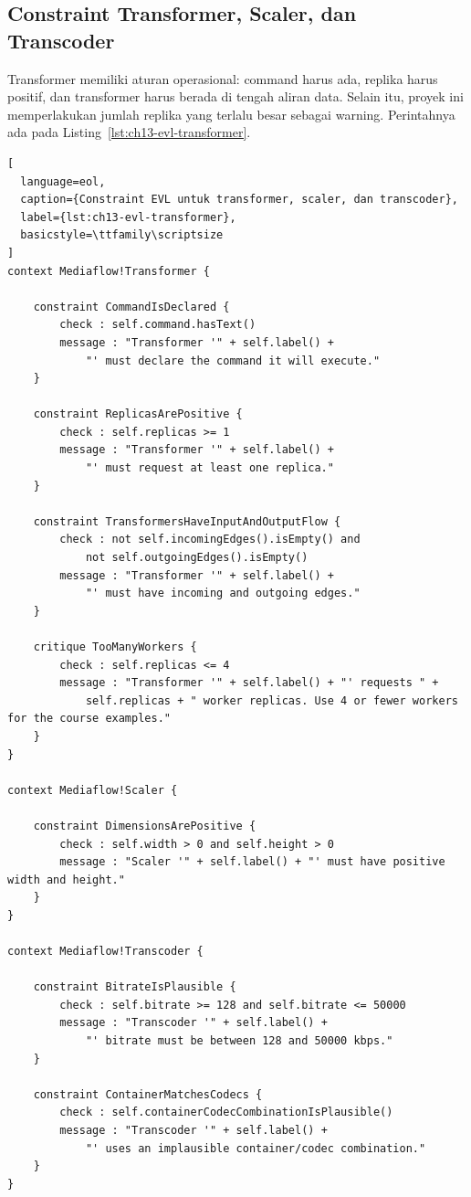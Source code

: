 \subsection{Constraint Transformer, Scaler, dan Transcoder}

Transformer memiliki aturan operasional: command harus ada, replika harus positif, dan transformer harus berada di tengah aliran data. Selain itu, proyek ini memperlakukan jumlah replika yang terlalu besar sebagai warning. Perintahnya ada pada Listing~\ref{lst:ch13-evl-transformer}.

\begin{lstlisting}[
  language=eol,
  caption={Constraint EVL untuk transformer, scaler, dan transcoder},
  label={lst:ch13-evl-transformer},
  basicstyle=\ttfamily\scriptsize
]
context Mediaflow!Transformer {

    constraint CommandIsDeclared {
        check : self.command.hasText()
        message : "Transformer '" + self.label() +
            "' must declare the command it will execute."
    }

    constraint ReplicasArePositive {
        check : self.replicas >= 1
        message : "Transformer '" + self.label() +
            "' must request at least one replica."
    }

    constraint TransformersHaveInputAndOutputFlow {
        check : not self.incomingEdges().isEmpty() and
            not self.outgoingEdges().isEmpty()
        message : "Transformer '" + self.label() +
            "' must have incoming and outgoing edges."
    }

    critique TooManyWorkers {
        check : self.replicas <= 4
        message : "Transformer '" + self.label() + "' requests " +
            self.replicas + " worker replicas. Use 4 or fewer workers for the course examples."
    }
}

context Mediaflow!Scaler {

    constraint DimensionsArePositive {
        check : self.width > 0 and self.height > 0
        message : "Scaler '" + self.label() + "' must have positive width and height."
    }
}

context Mediaflow!Transcoder {

    constraint BitrateIsPlausible {
        check : self.bitrate >= 128 and self.bitrate <= 50000
        message : "Transcoder '" + self.label() +
            "' bitrate must be between 128 and 50000 kbps."
    }

    constraint ContainerMatchesCodecs {
        check : self.containerCodecCombinationIsPlausible()
        message : "Transcoder '" + self.label() +
            "' uses an implausible container/codec combination."
    }
}
\end{lstlisting}

